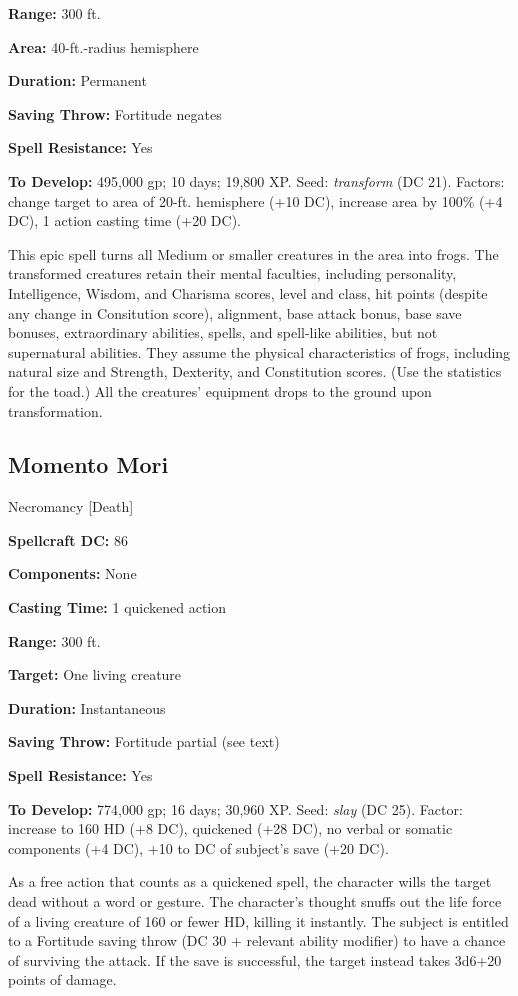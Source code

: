 \documentclass{article}
\begin{document}
\textbf{Range:} 300 ft. 

\textbf{Area:} 40-ft.-radius hemisphere 

\textbf{Duration:} Permanent 

\textbf{Saving Throw:} Fortitude negates 

\textbf{Spell Resistance:} Yes 

\textbf{To Develop:} 495,000 gp; 10 days; 19,800 XP. Seed: \textit{transform }(DC 
21). Factors: change target to area of 20-ft. hemisphere (+10 DC), increase area 
by 100\% (+4 DC), 1 action casting time (+20 DC). 

This epic spell turns all Medium or smaller creatures in the area into frogs. The 
transformed creatures retain their mental faculties, including personality, Intelligence, 
Wisdom, and Charisma scores, level and class, hit points (despite any change in 
Consitution score), alignment, base attack bonus, base save bonuses, extraordinary 
abilities, spells, and spell-like abilities, but not supernatural abilities. They 
assume the physical characteristics of frogs, including natural size and Strength, 
Dexterity, and Constitution scores. (Use the statistics for the toad.) All the 
creatures' equipment drops to the ground upon transformation. 

\vspace{12pt}
\subsection*{Momento Mori }

Necromancy [Death] 

\textbf{Spellcraft DC:} 86 

\textbf{Components:} None 

\textbf{Casting Time:} 1 quickened action 

\textbf{Range:} 300 ft. 

\textbf{Target:} One living creature 

\textbf{Duration:} Instantaneous 

\textbf{Saving Throw:} Fortitude partial (see text) 

\textbf{Spell Resistance:} Yes 

\textbf{To Develop:} 774,000 gp; 16 days; 30,960 XP. Seed: \textit{slay }(DC 25). 
Factor: increase to 160 HD (+8 DC), quickened (+28 DC), no verbal or somatic components 
(+4 DC), +10 to DC of subject's save (+20 DC). 

As a free action that counts as a quickened spell, the character wills the target 
dead without a word or gesture. The character's thought snuffs out the life force 
of a living creature of 160 or fewer HD, killing it instantly. The subject is entitled 
to a Fortitude saving throw (DC 30 + relevant ability modifier) to have a chance 
of surviving the attack. If the save is successful, the target instead takes 3d6+20 
points of damage. 
\end{document}

